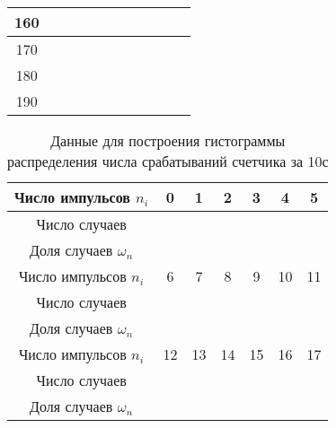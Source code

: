 \documentclass[a4paper,12pt]{article} %
\begin{document}
\begin{table}[h]
\begin{tabular}{|c|l|l|l|l|l|l|l|l|l|l|}
160     &                        &                        &                        &                        &                        &                        &                        &                        &                        &                         \\ \hline
170     &                        &                        &                        &                        &                        &                        &                        &                        &                        &                         \\ \hline
180     &                        &                        &                        &                        &                        &                        &                        &                        &                        &                         \\ \hline
190     &                        &                        &                        &                        &                        &                        &                        &                        &                        &                         \\ \hline
\end{tabular}
\end{table}

\begin{table}[h!]
\renewcommand{\tabcolsep}{5mm}
\centering
\caption{Данные для построения гистограммы распределения числа срабатываний счетчика за 10с}
\label{table 2}
\begin{tabular}{|c|c|c|c|c|c|c|}
\hline
Число импульсов $n_i$ & 0 & 1 & 2 & 3 & 4 & 5 \\ \hline
Число случаев   &   &   &   &   &   &   \\ \hline
Доля случаев $\omega_n$   &   &   &   &   &   &   \\ \hline\hline
Число импульсов $n_i$ & 6 & 7 & 8 & 9 &10 & 11 \\ \hline
Число случаев   &   &   &   &   &   &   \\ \hline
Доля случаев $\omega_n$   &   &   &   &   &   &   \\ \hline\hline
Число импульсов $n_i$ & 12 & 13 & 14 & 15 &16 & 17 \\ \hline
Число случаев   &   &   &   &   &   &   \\ \hline
Доля случаев $\omega_n$   &   &   &   &   &   &   \\ \hline
\end{tabular}
\end{table}
\end{document}
